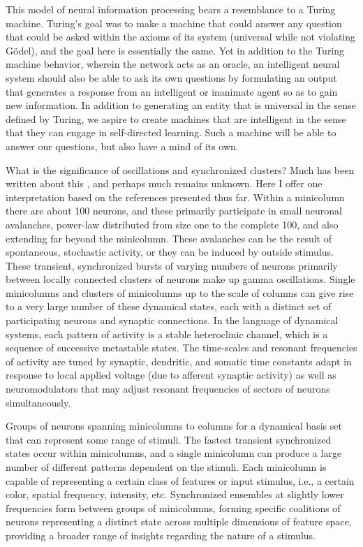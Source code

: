 This model of neural information processing bears a resemblance to a Turing machine. Turing's goal was to make a machine that could answer any question that could be asked within the axioms of its system (universal while not violating G\"{o}del), and the goal here is essentially the same. Yet in addition to the Turing machine behavior, wherein the network acts as an oracle, an intelligent neural system should also be able to ask its own questions by formulating an output that generates a response from an intelligent or inanimate agent so as to gain new information. In addition to generating an entity that is universal in the sense defined by Turing, we aspire to create machines that are intelligent in the sense that they can engage in self-directed learning. Such a machine will be able to answer our questions, but also have a mind of its own.

\vspace{3em}
What is the significance of oscillations and synchronized clusters? Much has been written about this \cite{}, and perhaps much remains unknown. Here I offer one interpretation based on the references presented thus far. Within a minicolumn there are about 100 neurons, and these primarily participate in small neuronal avalanches, power-law distributed from size one to the complete 100, and also extending far beyond the minicolumn. These avalanches can be the result of spontaneous, stochastic activity, or they can be induced by outside stimulus. These transient, synchronized bursts of varying numbers of neurons primarily between locally connected clusters of neurons make up gamma oscillations. Single minicolumns and clusters of minicolumns up to the scale of columns can give rise to a very large number of these dynamical states, each with a distinct set of participating neurons and synaptic connections. In the language of dynamical systems, each pattern of activity is a stable heteroclinic channel, which is a sequence of successive metastable states. The time-scales and resonant frequencies of activity are tuned by synaptic, dendritic, and somatic time constants adapt in response to local applied voltage (due to afferent synaptic activity) as well as neuromodulators that may adjust resonant frequencies of sectors of neurons simultaneously.

Groups of neurons spanning minicolumns to columns for a dynamical basis set \cite{rahu2008,one_from_reading_group} that can represent some range of stimuli. The fastest transient synchronized states occur within minicolumns, and a single minicolumn can produce a large number of different patterns dependent on the stimuli. Each minicolumn is capable of representing a certain class of features or input stimulus, i.e., a certain color, spatial frequency, intensity, etc. Synchronized ensembles at slightly lower frequencies form between groups of minicolumns, forming specific coalitions of neurons representing a distinct state across multiple dimensions of feature space, providing a broader range of insights regarding the nature of a stimulus. 

